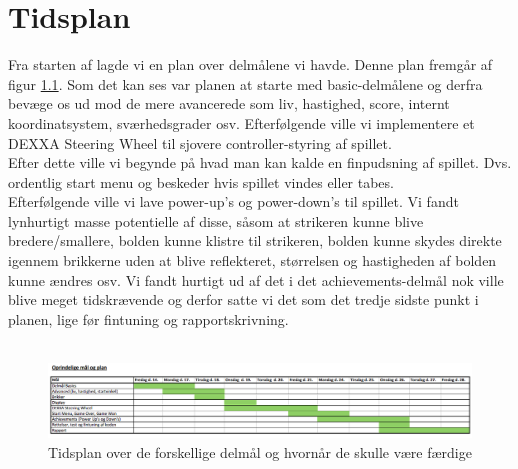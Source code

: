 \chapter{Tidsplan}
Fra starten af lagde vi en plan over delmålene vi havde. Denne plan fremgår af figur \ref{fig:tidsplan1}. Som det kan ses var planen at starte med basic-delmålene og derfra bevæge os ud mod de mere avancerede som liv, hastighed, score, internt koordinatsystem, sværhedsgrader osv. Efterfølgende ville vi implementere et DEXXA Steering Wheel til sjovere controller-styring af spillet.\\
Efter dette ville vi begynde på hvad man kan kalde en finpudsning af spillet. Dvs. ordentlig start menu og beskeder hvis spillet vindes eller tabes. \\

Efterfølgende ville vi lave power-up's og power-down's til spillet. Vi fandt lynhurtigt masse potentielle af disse, såsom at strikeren kunne blive bredere/smallere, bolden kunne klistre til strikeren, bolden kunne skydes direkte igennem brikkerne uden at blive reflekteret, størrelsen og hastigheden af bolden kunne ændres osv. Vi fandt hurtigt ud af det i det achievements-delmål nok ville blive meget tidskrævende og derfor satte vi det som det tredje sidste punkt i planen, lige før fintuning og rapportskrivning.\\ \\


\begin{figure}[h!]
\centering
\includegraphics[scale=0.4]{figs/Tidsplan1.png}
\caption{Tidsplan over de forskellige delmål og hvornår de skulle være færdige}
\label{fig:tidsplan1}
\end{figure}